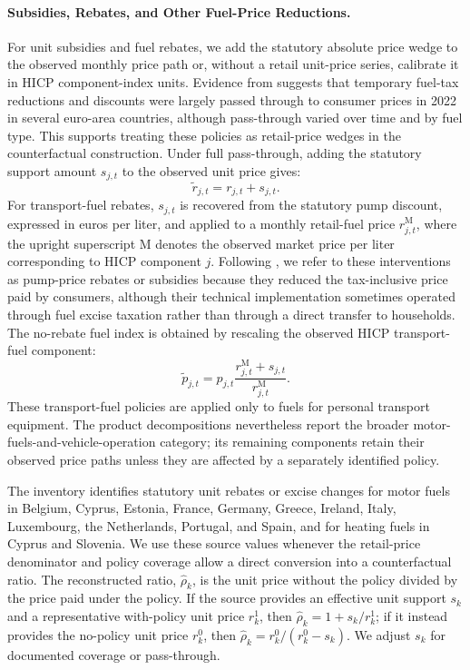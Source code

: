 \documentclass[11pt]{article}
\begin{document}
\paragraph{Subsidies, Rebates, and Other Fuel-Price Reductions.}
For unit subsidies and fuel rebates, we add the statutory absolute price wedge to the observed
monthly price path or, without a retail unit-price series, calibrate it in HICP component-index
units. Evidence from
\citet{drolsbach2023pass} suggests that temporary fuel-tax reductions and discounts were largely
passed through to consumer prices in 2022 in several euro-area countries, although pass-through
varied over time and by fuel type. This supports treating these policies as retail-price wedges in
the counterfactual construction.
Under full pass-through, adding the statutory support amount $s_{j,t}$ to the observed unit price gives:
\begin{equation}
\widetilde r_{j,t}
=
r_{j,t}+s_{j,t}.
\end{equation}
For transport-fuel rebates, $s_{j,t}$ is recovered from the statutory pump discount, expressed in
euros per liter, and applied to a monthly retail-fuel price $r^{\mathrm{M}}_{j,t}$, where the upright
superscript $\mathrm{M}$ denotes the observed market price per liter corresponding to HICP component
$j$. Following \citet{bonnet2025compensating}, we refer to these interventions as pump-price
rebates or subsidies because they reduced the tax-inclusive price paid by consumers, although their
technical implementation sometimes operated through fuel excise taxation rather than through a
direct transfer to households. The no-rebate fuel index is obtained by rescaling the observed HICP
transport-fuel component:
\[
\widetilde p_{j,t}
= p_{j,t}
\frac{r^{\mathrm{M}}_{j,t}+s_{j,t}}{r^{\mathrm{M}}_{j,t}} .
\]
These transport-fuel policies are applied only to fuels for personal transport
equipment. The product decompositions nevertheless
report the broader motor-fuels-and-vehicle-operation category; its remaining components retain their observed price paths
unless they are affected by a separately identified policy.

The inventory identifies statutory unit rebates or excise changes for motor fuels in Belgium,
Cyprus, Estonia, France, Germany, Greece, Ireland, Italy, Luxembourg, the Netherlands, Portugal,
and Spain, and for heating fuels in Cyprus and Slovenia. We use these source values whenever the
retail-price denominator and policy coverage allow a direct conversion into a counterfactual ratio.
The reconstructed ratio, $\widehat{\rho}_k$, is the unit price without the policy divided by the
price paid under the policy. If the source provides an effective unit support $s_k$ and a
representative with-policy unit price $r_k^{1}$, then
$\widehat{\rho}_k=1+s_k/r_k^{1}$; if it instead provides the no-policy unit price $r_k^0$, then
$\widehat{\rho}_k=r_k^0/(r_k^0-s_k)$. We adjust $s_k$ for documented coverage or pass-through.
\end{document}
